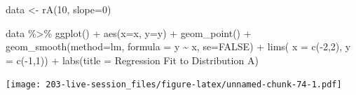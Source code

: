\documentclass[
]{book}
\newenvironment{Shaded}{\begin{snugshade}}{\end{snugshade}}
\newcommand{\AttributeTok}[1]{\textcolor[rgb]{0.77,0.63,0.00}{#1}}
\newcommand{\ConstantTok}[1]{\textcolor[rgb]{0.00,0.00,0.00}{#1}}
\newcommand{\DecValTok}[1]{\textcolor[rgb]{0.00,0.00,0.81}{#1}}
\newcommand{\FunctionTok}[1]{\textcolor[rgb]{0.00,0.00,0.00}{#1}}
\newcommand{\NormalTok}[1]{#1}
\newcommand{\OtherTok}[1]{\textcolor[rgb]{0.56,0.35,0.01}{#1}}
\newcommand{\SpecialCharTok}[1]{\textcolor[rgb]{0.00,0.00,0.00}{#1}}
\newcommand{\StringTok}[1]{\textcolor[rgb]{0.31,0.60,0.02}{#1}}
\theoremstyle{definition}
\theoremstyle{definition}
\theoremstyle{definition}
\theoremstyle{definition}
\theoremstyle{remark}
\begin{document}
\begin{Shaded}
\begin{Highlighting}[]
\NormalTok{data }\OtherTok{\textless{}{-}}  \FunctionTok{rA}\NormalTok{(}\DecValTok{10}\NormalTok{, }\AttributeTok{slope=}\DecValTok{0}\NormalTok{)}

\NormalTok{data }\SpecialCharTok{\%\textgreater{}\%} 
  \FunctionTok{ggplot}\NormalTok{() }\SpecialCharTok{+} 
  \FunctionTok{aes}\NormalTok{(}\AttributeTok{x=}\NormalTok{x, }\AttributeTok{y=}\NormalTok{y) }\SpecialCharTok{+} 
  \FunctionTok{geom\_point}\NormalTok{() }\SpecialCharTok{+} 
  \FunctionTok{geom\_smooth}\NormalTok{(}\AttributeTok{method=}\StringTok{\textquotesingle{}lm\textquotesingle{}}\NormalTok{, }\AttributeTok{formula =} \StringTok{\textquotesingle{}y \textasciitilde{} x\textquotesingle{}}\NormalTok{, }\AttributeTok{se=}\ConstantTok{FALSE}\NormalTok{) }\SpecialCharTok{+} 
  \FunctionTok{lims}\NormalTok{(}
    \AttributeTok{x =} \FunctionTok{c}\NormalTok{(}\SpecialCharTok{{-}}\DecValTok{2}\NormalTok{,}\DecValTok{2}\NormalTok{), }
    \AttributeTok{y =} \FunctionTok{c}\NormalTok{(}\SpecialCharTok{{-}}\DecValTok{1}\NormalTok{,}\DecValTok{1}\NormalTok{)) }\SpecialCharTok{+} 
  \FunctionTok{labs}\NormalTok{(}\AttributeTok{title =} \StringTok{\textquotesingle{}Regression Fit to Distribution A\textquotesingle{}}\NormalTok{)}
\end{Highlighting}
\end{Shaded}

\texttt{[image: 203-live-session\_files/figure-latex/unnamed-chunk-74-1.pdf]}
\end{document}
